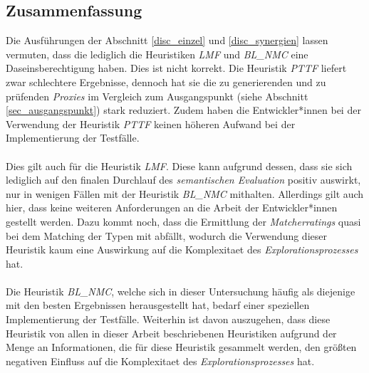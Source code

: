 \subsection{Zusammenfassung}
Die Ausführungen der Abschnitt \ref{disc_einzel} und \ref{disc_synergien} lassen vermuten, dass die lediglich die \Gls{Heuristik}en \emph{LMF} und \emph{BL\_NMC} eine Daseinsberechtigung haben. Dies ist nicht korrekt. Die \Gls{Heuristik} \emph{PTTF} liefert zwar schlechtere Ergebnisse, dennoch hat sie die zu generierenden und zu prüfenden \emph{Proxies} im Vergleich zum Ausgangspunkt (siehe Abschnitt \ref{sec_ausgangspunkt}) stark reduziert. Zudem haben die Entwickler*innen bei der Verwendung der \Gls{Heuristik} \emph{PTTF} keinen höheren Aufwand bei der Implementierung der Testfälle. 
\\\\
Dies gilt auch für die \Gls{Heuristik} \emph{LMF}. Diese kann aufgrund dessen, dass sie sich lediglich auf den finalen Durchlauf des \emph{semantischen Evaluation} positiv auswirkt, nur in wenigen Fällen mit der \Gls{Heuristik} \emph{BL\_NMC} mithalten. Allerdings gilt auch hier, dass keine weiteren Anforderungen an die Arbeit der Entwickler*innen gestellt werden. Dazu kommt noch, dass die Ermittlung der \emph{Matcherratings} quasi bei dem Matching der Typen mit abfällt, wodurch die Verwendung dieser \Gls{Heuristik} kaum eine Auswirkung auf die \Gls{Komplexitaet} des \emph{Explorationsprozesses} hat.
\\\\
Die \Gls{Heuristik} \emph{BL\_NMC}, welche sich in dieser Untersuchung häufig als diejenige mit den besten Ergebnissen herausgestellt hat, bedarf einer speziellen Implementierung der Testfälle. Weiterhin ist davon auszugehen, dass diese \Gls{Heuristik} von allen in dieser Arbeit beschriebenen \Gls{Heuristik}en aufgrund der Menge an Informationen, die für diese \Gls{Heuristik} gesammelt werden, den größten negativen Einfluss auf die \Gls{Komplexitaet} des \emph{Explorationsprozesses} hat.


